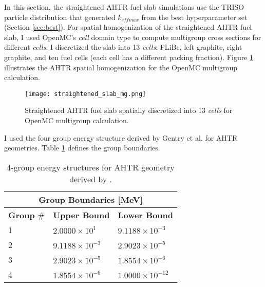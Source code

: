 In this section, the straightened AHTR fuel slab simulations use the \gls{TRISO} 
particle distribution that generated $k_{eff max}$ from the best hyperparameter 
set (Section \ref{sec:best}). 
For spatial homogenization of the straightened \gls{AHTR} fuel slab, I used 
OpenMC's \textit{cell} domain type to compute multigroup cross sections for 
different \textit{cells}. 
I discretized the slab into 13 \textit{cells}: FLiBe, left graphite, right 
graphite, and ten fuel cells (each cell has a different packing fraction). 
Figure \ref{fig:straightened_slab_mg} illustrates the \gls{AHTR} spatial 
homogenization for the OpenMC multigroup calculation. 
\begin{figure}[]
    \centering
    \texttt{[image: straightened\_slab\_mg.png]}
    \raggedright
    \caption{Straightened \acrfull{AHTR} fuel slab spatially discretized into 
    13 \textit{cells} for OpenMC multigroup calculation.}
    \label{fig:straightened_slab_mg}
\end{figure}
I used the four group energy structure derived by Gentry et al. 
\cite{gentry_development_2016} for \gls{AHTR} geometries. 
Table \ref{tab:energy_structures} defines the group boundaries. 
\begin{table}[]
    \centering
    \onehalfspacing
    \caption{4-group energy structures for \acrfull{AHTR} geometry 
    derived by \cite{gentry_development_2016}.}
	\label{tab:energy_structures}
    \footnotesize
    \begin{tabular}{lll}
    \hline
    \multicolumn{3}{c}{\textbf{Group Boundaries [MeV]}} \\ 
    \hline
    \textbf{Group $\#$}& \textbf{Upper Bound} & \textbf{Lower Bound}  \\
    \hline 
    1 & $2.0000\times 10^1$ & $9.1188\times 10^{-3}$ \\ 
    2 & $9.1188\times 10^{-3}$ & $2.9023\times 10^{-5}$\\
    3 & $2.9023\times 10^{-5}$ & $1.8554\times 10^{-6}$\\
    4 & $1.8554\times 10^{-6}$ & $1.0000\times 10^{-12}$\\
    \hline
    \end{tabular}
\end{table}

